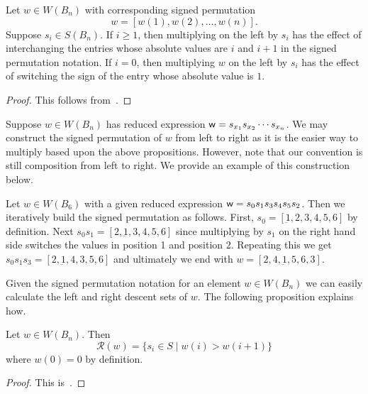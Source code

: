 \begin{proposition}
Let $w \in W(B_n)$ with corresponding signed permutation 
	\[w=[w(1),w(2), \ldots ,w(n)].\] Suppose $s_i \in S(B_n)$. If $i \geq 1$, then multiplying on the left by $s_i$ has the effect of interchanging the entries whose absolute values are $i$ and $i+1$ in the signed permutation notation. If $i=0$, then multiplying $w$ on the left by $s_i$ has the effect of switching the sign of the entry whose absolute value is $1$.
	\begin{proof}
	This follows from~\cite[Section 8.1 and A3.1]{Bjorner2005}.	
	\end{proof}
\end{proposition}

Suppose $w \in W(B_n)$ has reduced expression $\mathsf{w}=s_{x_1}s_{x_2}\cdots s_{x_n}$. We may construct the signed permutation of $w$ from left to right as it is the easier way to multiply based upon the above propositions. However, note that our convention is still composition from left to right. We provide an example of this construction below.

\begin{example}
Let $w \in W(B_6)$ with a given reduced expression $\mathsf{w}=s_0s_1s_3s_4s_5s_2$. Then we iteratively build the signed permutation as follows. First, $s_0=[\underbar{1},2,3,4,5,6]$ by definition. Next $s_0s_1=[2,\underbar{1},3,4,5,6]$ since multiplying by $s_1$ on the right hand side switches the values in position 1 and position 2. Repeating this we get $s_0s_1s_3=[2,\underbar{1},4,3,5,6]$ and ultimately we end with $w=[2,4,\underbar{1},5,6,3]$. 

\end{example}

Given the signed permutation notation for an element $w \in W(B_n)$ we can easily calculate the left and right descent sets of $w$. The following proposition explains how.

\begin{proposition}\label{prop:descent}
Let $w \in W(B_n)$. Then 
\[ \mathcal{R}(w)=\{s_i \in S \mid w(i) > w(i+1)\} \]
where $w(0)=0$ by definition.
\begin{proof}
	This is~\cite[Proposition 8.1.2]{Bjorner2005}.
\end{proof}
\end{proposition}

